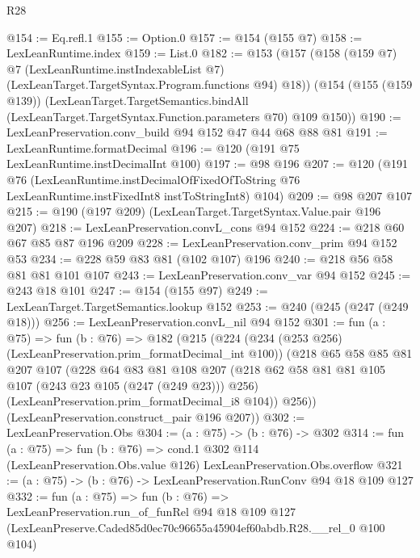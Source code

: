 \begin{lexlean}{R28}
\begin{coremodule}
@154 := Eq.refl.{1}
@155 := Option.{0}
@157 := @154 (@155 @7)
@158 := LexLeanRuntime.index
@159 := List.{0}
@182 := @153
    (@157
      (@158
        (@159 @7)
        @7
        (LexLeanRuntime.instIndexableList @7)
        (LexLeanTarget.TargetSyntax.Program.functions @94)
        @18))
    (@154
      (@155 (@159 @139))
      (LexLeanTarget.TargetSemantics.bindAll
        (LexLeanTarget.TargetSyntax.Function.parameters @70)
        @109
        @150))
@190 := LexLeanPreservation.conv_build @94 @152 @47 @44 @68 @88 @81
@191 := LexLeanRuntime.formatDecimal
@196 := @120 (@191 @75 LexLeanRuntime.instDecimalInt @100)
@197 := @98 @196
@207 := @120
    (@191
      @76
      (LexLeanRuntime.instDecimalOfFixedOfToString
        @76
        LexLeanRuntime.instFixedInt8
        instToStringInt8)
      @104)
@209 := @98 @207 @107
@215 := @190 (@197 @209) (LexLeanTarget.TargetSyntax.Value.pair @196 @207)
@218 := LexLeanPreservation.convL_cons @94 @152
@224 := @218 @60 @67 @85 @87 @196 @209
@228 := LexLeanPreservation.conv_prim @94 @152 @53
@234 := @228 @59 @83 @81 (@102 @107) @196
@240 := @218 @56 @58 @81 @81 @101 @107
@243 := LexLeanPreservation.conv_var @94 @152
@245 := @243 @18 @101
@247 := @154 (@155 @97)
@249 := LexLeanTarget.TargetSemantics.lookup @152
@253 := @240 (@245 (@247 (@249 @18)))
@256 := LexLeanPreservation.convL_nil @94 @152
@301 := fun (a : @75) =>
  fun (b : @76) =>
  @182
    (@215
      (@224
        (@234 (@253 @256) (LexLeanPreservation.prim_formatDecimal_int @100))
        (@218
          @65
          @58
          @85
          @81
          @207
          @107
          (@228
            @64
            @83
            @81
            @108
            @207
            (@218 @62 @58 @81 @81 @105 @107 (@243 @23 @105 (@247 (@249 @23))) @256)
            (LexLeanPreservation.prim_formatDecimal_i8 @104))
          @256))
      (LexLeanPreservation.construct_pair @196 @207))
@302 := LexLeanPreservation.Obs
@304 := (a : @75) -> (b : @76) -> @302
@314 := fun (a : @75) =>
  fun (b : @76) =>
  cond.{1} @302 @114 (LexLeanPreservation.Obs.value @126) LexLeanPreservation.Obs.overflow
@321 := (a : @75) -> (b : @76) -> LexLeanPreservation.RunConv @94 @18 @109 @127
@332 := fun (a : @75) =>
  fun (b : @76) =>
  LexLeanPreservation.run_of_funRel
    @94
    @18
    @109
    @127
    (LexLeanPreserve.Caded85d0ec70c96655a45904ef60abdb.R28.__rel_0 @100 @104)
\end{coremodule}
\end{lexlean}
